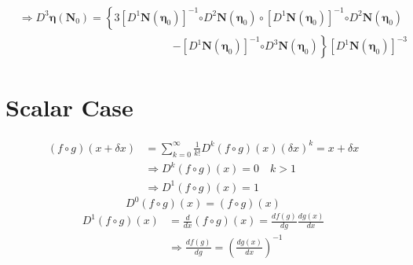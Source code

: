 \documentclass[aps,preprint]{revtex4}%
\begin{document}
\begin{align}
&  \Rightarrow D^{3}\mathbf{\eta}\left(  \mathbf{N}_{0}\right)  =\left\{
3\left[  D^{1}\mathbf{N}\left(  \mathbf{\eta}_{0}\right)  \right]
^{-1}\mathbf{\circ}D^{2}\mathbf{N}\left(  \mathbf{\eta}_{0}\right)
\circ\left[  D^{1}\mathbf{N}\left(  \mathbf{\eta}_{0}\right)  \right]
^{-1}\mathbf{\circ}D^{2}\mathbf{N}\left(  \mathbf{\eta}_{0}\right)  \right.
\nonumber\\
&  \qquad\qquad\qquad\qquad\qquad\qquad\qquad\left.  -\left[  D^{1}%
\mathbf{N}\left(  \mathbf{\eta}_{0}\right)  \right]  ^{-1}\mathbf{\circ}%
D^{3}\mathbf{N}\left(  \mathbf{\eta}_{0}\right)  \right\}  \left[
D^{1}\mathbf{N}\left(  \mathbf{\eta}_{0}\right)  \right]  ^{-3}%
\end{align}


\section{Scalar Case}%

\begin{align}
\left(  f\circ g\right)  \left(  x+\delta x\right)   &  =\sum\limits_{k=0}%
^{\infty}\frac{1}{k!}D^{k}\left(  f\circ g\right)  \left(  x\right)  \left(
\delta x\right)  ^{k}=x+\delta x\nonumber\\
&  \Rightarrow D^{k}\left(  f\circ g\right)  \left(  x\right)  =0\quad
k>1\nonumber\\
&  \Rightarrow D^{1}\left(  f\circ g\right)  \left(  x\right)  =1
\end{align}%
\begin{equation}
D^{0}\left(  f\circ g\right)  \left(  x\right)  =\left(  f\circ g\right)
\left(  x\right)
\end{equation}%
\begin{align}
D^{1}\left(  f\circ g\right)  \left(  x\right)   &  =\frac{d}{dx}\left(
f\circ g\right)  \left(  x\right)  =\frac{df\left(  g\right)  }{dg}%
\frac{dg\left(  x\right)  }{dx}\nonumber\\
&  \Rightarrow\frac{df\left(  g\right)  }{dg}=\left(  \frac{dg\left(
x\right)  }{dx}\right)  ^{-1}%
\end{align}
%
\end{document}

